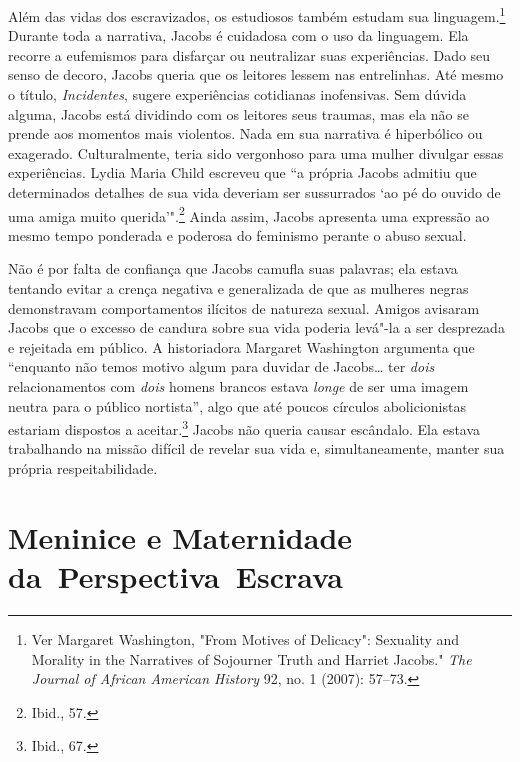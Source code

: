 Além das vidas dos escravizados, os estudiosos também estudam sua
linguagem.\footnote{Ver Margaret Washington, "From Motives of Delicacy":
  Sexuality and Morality in the Narratives of Sojourner Truth and
  Harriet Jacobs." \emph{The Journal of African American History} 92,
  no. 1 (2007): 57--73.} Durante toda a narrativa, Jacobs é cuidadosa com
o uso da linguagem. Ela recorre a eufemismos para disfarçar ou
neutralizar suas experiências. Dado seu senso de decoro, Jacobs queria
que os leitores lessem nas entrelinhas. Até mesmo o título,
\emph{Incidentes}, sugere experiências cotidianas inofensivas. Sem
dúvida alguma, Jacobs está dividindo com os leitores seus traumas, mas
ela não se prende aos momentos mais violentos. Nada em sua narrativa é
hiperbólico ou exagerado. Culturalmente, teria sido vergonhoso para uma
mulher divulgar essas experiências. Lydia Maria Child escreveu que ``a
própria Jacobs admitiu que determinados detalhes de sua vida deveriam
ser sussurrados `ao pé do ouvido de uma amiga muito
querida'".\footnote{Ibid., 57.} Ainda assim, Jacobs apresenta uma
expressão ao mesmo tempo ponderada e poderosa do feminismo perante o
abuso sexual.

Não é por falta de confiança que Jacobs camufla suas palavras; ela
estava tentando evitar a crença negativa e generalizada de que as
mulheres negras demonstravam comportamentos ilícitos de natureza sexual.
Amigos avisaram Jacobs que o excesso de candura sobre sua vida poderia
levá"-la a ser desprezada e rejeitada em público. A historiadora Margaret
Washington argumenta que ``enquanto não temos motivo algum para duvidar
de Jacobs\ldots{} ter \emph{dois} relacionamentos com \emph{dois} homens
brancos estava \emph{longe} de ser uma imagem neutra para o público
nortista'', algo que até poucos círculos abolicionistas estariam
dispostos a aceitar.\footnote{Ibid., 67.} Jacobs não queria causar
escândalo. Ela estava trabalhando na missão difícil de revelar sua vida
e, simultaneamente, manter sua própria respeitabilidade.

\section{Meninice e Maternidade da~Perspectiva~Escrava}

